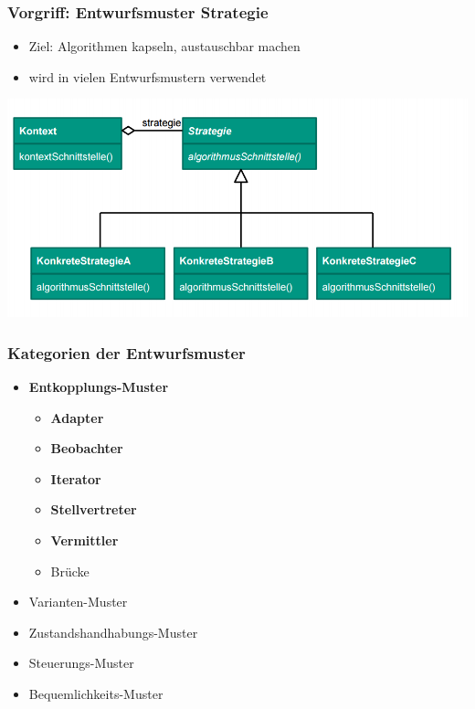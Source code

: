 \documentclass[18pt]{beamer}
\begin{document}
	\begin{frame}
		\frametitle{Vorgriff: Entwurfsmuster Strategie}
		\begin{itemize}
			\item Ziel: Algorithmen kapseln, austauschbar machen
			\item wird in vielen Entwurfsmustern verwendet
		\end{itemize}
		\includegraphics[scale=0.5]{./pics/tut3/strat.png}
	\end{frame}

	\begin{frame}
		\frametitle{Kategorien der Entwurfsmuster}
		\begin{itemize}
			\item \textbf{Entkopplungs-Muster}
				\begin{itemize}
					\item \textbf{Adapter}
					\item \textbf{Beobachter}
					\item \textbf{Iterator}
					\item \textbf{Stellvertreter}
					\item \textbf{Vermittler}
					\item Brücke
				\end{itemize}
			\item Varianten-Muster
			\item Zustandshandhabungs-Muster
			\item Steuerungs-Muster
			\item Bequemlichkeits-Muster
		\end{itemize}
	\end{frame}
\end{document}
